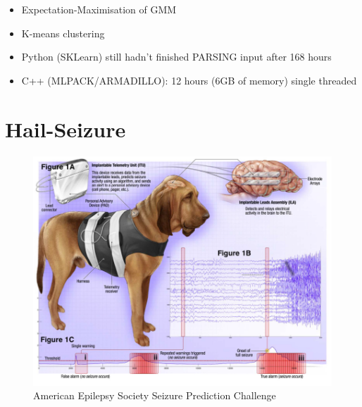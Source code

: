 \documentclass[ignorenonframetext,]{beamer}
\begin{document}
\begin{frame}

\begin{itemize}
\itemsep1pt\parskip0pt
\item
  Expectation-Maximisation of GMM
\item
  K-means clustering
\item
  Python (SKLearn) still hadn't finished PARSING input after 168 hours
\item
  C++ (MLPACK/ARMADILLO): 12 hours (6GB of memory) single threaded
\end{itemize}

\end{frame}

\section{Hail-Seizure}\label{hail-seizure}

\begin{frame}

\begin{figure}[htbp]
\centering
\includegraphics{assets/presentation/GIML/hs_dog.png}
\caption{American Epilepsy Society Seizure Prediction Challenge}
\end{figure}

\end{frame}
\end{document}
